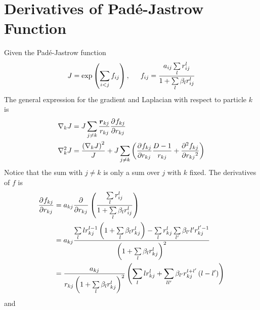 \section{Derivatives of Pad\'e-Jastrow Function}
    Given the Pad\'e-Jastrow function
        \begin{equation}
            J = \exp\left(\sum\limits_{i<j}f_{ij}\right) ,\indent f_{ij} =
            \frac{a_{ij}\sum\limits_l r^l_{ij}}{1 + \sum\limits_l \beta_l
            r^l_{ij}}
        \end{equation}
    The general expression for the gradient and Laplacian with respect to
    particle $k$ is
        \begin{equation}
            \begin{aligned}
                \nabla_k J &= J\sum_{j\neq k} \frac{\blds{r}_{kj}}{r_{kj}}
                \prd{r_{kj}}[f_{kj}] \\
                \nabla^2_k J &= \frac{\left(\nabla_k J\right)^2}{J} +
                J\sum_{j\neq k} \left(\prd{r_{kj}}[f_{kj}] \frac{D-1}{r_{kj}} +
                \prd{r_{kj}}[f_{kj}][2]\right)
            \end{aligned}
        \end{equation}
    Notice that the sum with $j\neq k$ is only a sum over $j$ with $k$ fixed.
    The derivatives of $f$ is
        \begin{align}
            \prd{r_{kj}}[f_{kj}] &= a_{kj}\prd{r_{kj}}
            \left(\frac{\sum\limits_l r^l_{ij}}{1 + \sum\limits_l \beta_l
            r^l_{ij}}\right) \nonumber \\
            &= a_{kj}\frac{\sum\limits_llr^{l-1}_{kj}\left(1 + \sum\limits_l
            \beta_l r^l_{kj}\right) - \sum\limits_l
            r^l_{kj}\sum\limits_{l'}\beta_{l'}l'r^{l'-1}_{kj}}{\left(1 +
            \sum\limits_l\beta_lr^l_{kj}\right)^2} \nonumber \\
            &= \frac{a_{kj}}{r_{kj}\left(1 +
            \sum\limits_l\beta_lr^l_{kj}\right)^2} \left(\sum_l lr^l_{kj} +
            \sum_{ll'}\beta_{l'}r^{l+l'}_{kj}\left(l-l'\right)\right)
        \end{align}
    and
